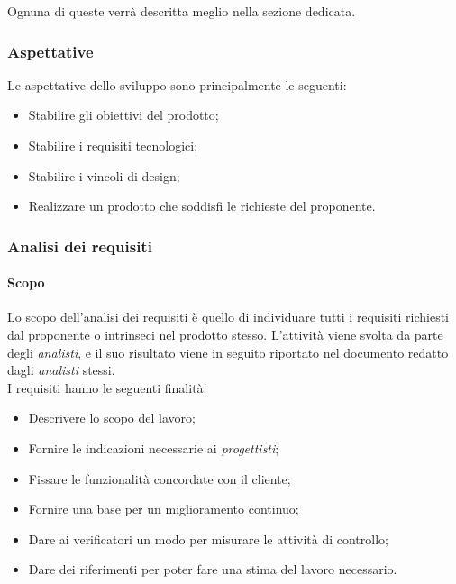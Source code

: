 Ognuna di queste verrà descritta meglio nella sezione dedicata.

\subsubsection{Aspettative}

Le aspettative dello sviluppo sono principalmente le seguenti:

\begin{itemize}
    \item Stabilire gli obiettivi del prodotto;
    \item Stabilire i requisiti tecnologici;
    \item Stabilire i vincoli di design;
    \item Realizzare un prodotto che soddisfi le richieste del proponente.
\end{itemize}

\subsubsection{Analisi dei requisiti}

\paragraph{Scopo}

Lo scopo dell'analisi dei requisiti è quello di individuare tutti i requisiti richiesti dal proponente o intrinseci nel 
prodotto stesso. L'attività viene svolta da parte degli \emph{analisti}, e il suo risultato viene in seguito riportato 
nel documento  redatto dagli \emph{analisti} stessi. \\
I requisiti hanno le seguenti finalità:
\begin{itemize}
    \item Descrivere lo scopo del lavoro;
    \item Fornire le indicazioni necessarie ai \emph{progettisti};
    \item Fissare le funzionalità concordate con il cliente;
    \item Fornire una base per un miglioramento continuo;
    \item Dare ai verificatori un modo per misurare le attività di controllo;
    \item Dare dei riferimenti per poter fare una stima del lavoro necessario.
\end{itemize}

